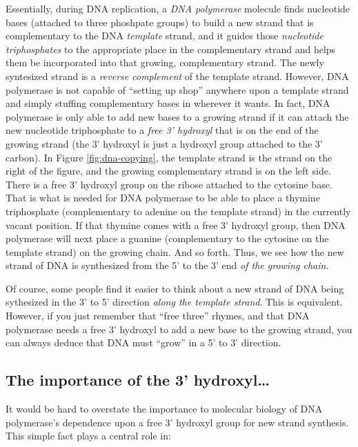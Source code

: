 \documentclass[]{krantz}
\begin{document}
Essentially, during DNA replication, a \emph{DNA polymerase} molecule finds nucleotide bases (attached
to three phoshpate groups) to build a new strand
that is complementary to the DNA \emph{template} strand, and it guides
those \emph{nucleotide triphosphates} to the appropriate
place in the complementary strand and helps them be incorporated into that growing,
complementary strand. The newly syntesized strand is a
\emph{reverse complement} of the template strand. However, DNA polymerase is not capable of
``setting up shop'' anywhere upon a template strand and simply stuffing complementary bases
in wherever it wants. In fact, DNA polymerase is only able to add new
bases to a growing strand if it can attach the new nucleotide triphosphate to a \emph{free 3' hydroxyl}
that is on the end of the growing strand (the 3' hydroxyl is just a hydroxyl
group attached to the 3' carbon). In Figure \ref{fig:dna-copying}, the template
strand is the strand on the right of the figure, and the growing complementary strand
is on the left side. There is a free 3' hydroxyl group on the ribose attached to the cytosine
base. That is what is needed for DNA polymerase to be able to place a
thymine triphosphate (complementary to adenine on
the template strand) in the currently vacant position. If that thymine comes with a free
3' hydroxyl group, then DNA polymerase will next place a guanine (complementary to the
cytosine on the template strand) on the growing chain. And so forth. Thus, we see
how the new strand of DNA is synthesized from the 5' to the 3' end \emph{of the growing chain}.

Of course, some people find it easier to think about a new strand of DNA being sythesized in
the 3' to 5' direction \emph{along the template strand}. This is equivalent. However, if you just remember
that ``free three'' rhymes, and that DNA polymerase needs a free 3' hydroxyl to add a new base
to the growing strand, you can always deduce that DNA must ``grow'' in a 5' to 3' direction.

\hypertarget{the-importance-of-the-3-hydroxyl}{%
\subsection{The importance of the 3' hydroxyl\ldots{}}\label{the-importance-of-the-3-hydroxyl}}

It would be hard to overstate the importance to molecular biology
of DNA polymerase's dependence upon
a free 3' hydroxyl group for new strand synthesis. This simple fact plays a central
role in:
\end{document}

